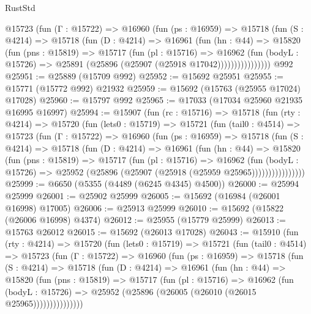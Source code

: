 \begin{lexlean}{RustStd}
\begin{coremodule}
            @15723
              (fun (Γ : @15722) =>
              @16960
                (fun (ps : @16959) =>
                @15718
                  (fun (S : @4214) =>
                  @15718
                    (fun (D : @4214) =>
                    @16961
                      (fun (hn : @44) =>
                      @15820
                        (fun (pns : @15819) =>
                        @15717
                          (fun (pl : @15716) =>
                          @16962
                            (fun (bodyL : @15726) =>
                            @25891 (@25896 (@25907 (@25918 @17042))))))))))))))))
    @992
@25951 := @25889 (@15709 @992)
@25952 := @15692 @25951
@25955 := @15771 (@15772 @992) @21932
@25959 := @15692 (@15763 (@25955 @17024) @17028)
@25960 := @15797 @992
@25965 := @17033 (@17034 @25960 @21935 @16995 @16997)
@25994 := @15907
    (fun (rc : @15716) =>
    @15718
      (fun (rty : @4214) =>
      @15720
        (fun (lets0 : @15719) =>
        @15721
          (fun (tail0 : @4514) =>
          @15723
            (fun (Γ : @15722) =>
            @16960
              (fun (ps : @16959) =>
              @15718
                (fun (S : @4214) =>
                @15718
                  (fun (D : @4214) =>
                  @16961
                    (fun (hn : @44) =>
                    @15820
                      (fun (pns : @15819) =>
                      @15717
                        (fun (pl : @15716) =>
                        @16962
                          (fun (bodyL : @15726) =>
                          @25952 (@25896 (@25907 (@25918 (@25959 @25965))))))))))))))))
@25999 := @6650 (@5355 (@4489 (@6245 @4345) @4500))
@26000 := @25994 @25999
@26001 := @25902 @25999
@26005 := @15692 (@16984 (@26001 @16998) @17005)
@26006 := @25913 @25999
@26010 := @15692 (@15822 (@26006 @16998) @4374)
@26012 := @25955 (@15779 @25999)
@26013 := @15763 @26012
@26015 := @15692 (@26013 @17028)
@26043 := @15910
    (fun (rty : @4214) =>
    @15720
      (fun (lets0 : @15719) =>
      @15721
        (fun (tail0 : @4514) =>
        @15723
          (fun (Γ : @15722) =>
          @16960
            (fun (ps : @16959) =>
            @15718
              (fun (S : @4214) =>
              @15718
                (fun (D : @4214) =>
                @16961
                  (fun (hn : @44) =>
                  @15820
                    (fun (pns : @15819) =>
                    @15717
                      (fun (pl : @15716) =>
                      @16962
                        (fun (bodyL : @15726) =>
                        @25952 (@25896 (@26005 (@26010 (@26015 @25965)))))))))))))))

\end{coremodule}
\end{lexlean}
